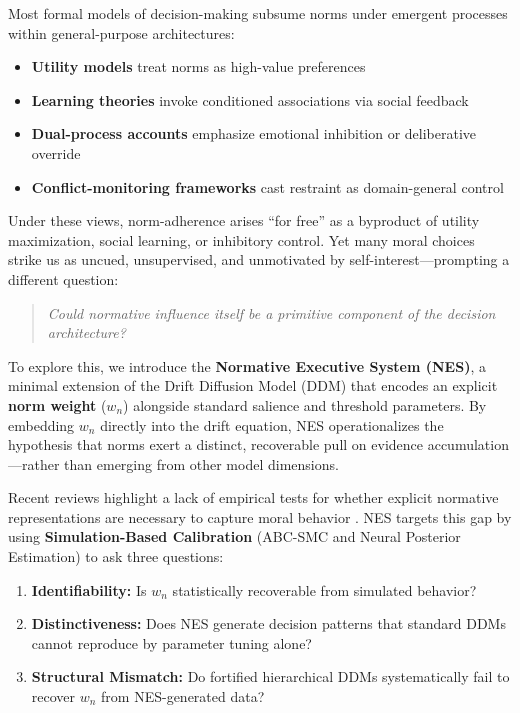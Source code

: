 \documentclass[
  11pt,
]{article}
\providecommand{\tightlist}{%
  \setlength{\itemsep}{0pt}\setlength{\parskip}{0pt}}
\begin{document}
Most formal models of decision-making subsume norms under emergent
processes within general-purpose architectures:

\begin{itemize}
\tightlist
\item
  \textbf{Utility models} treat norms as high-value preferences\\
\item
  \textbf{Learning theories} invoke conditioned associations via social
  feedback\\
\item
  \textbf{Dual-process accounts} emphasize emotional inhibition or
  deliberative override\\
\item
  \textbf{Conflict-monitoring frameworks} cast restraint as
  domain-general control
\end{itemize}

Under these views, norm-adherence arises ``for free'' as a byproduct of
utility maximization, social learning, or inhibitory control. Yet many
moral choices strike us as uncued, unsupervised, and unmotivated by
self-interest---prompting a different question:

\begin{quote}
\emph{Could normative influence itself be a primitive component of the
decision architecture?}
\end{quote}

To explore this, we introduce the \textbf{Normative Executive System
(NES)}, a minimal extension of the Drift Diffusion Model (DDM) that
encodes an explicit \textbf{norm weight} (\(w_n\)) alongside standard
salience and threshold parameters. By embedding \(w_n\) directly into
the drift equation, NES operationalizes the hypothesis that norms exert
a distinct, recoverable pull on evidence accumulation---rather than
emerging from other model dimensions.

Recent reviews highlight a lack of empirical tests for whether explicit
normative representations are necessary to capture moral behavior
\autocite{bello2023computationalapproachesto,cushman2015moralconstraints}.
NES targets this gap by using \textbf{Simulation-Based Calibration}
(ABC-SMC and Neural Posterior Estimation) to ask three questions:

\begin{enumerate}
\def\labelenumi{\arabic{enumi}.}
\tightlist
\item
  \textbf{Identifiability:} Is \(w_n\) statistically recoverable from
  simulated behavior?\\
\item
  \textbf{Distinctiveness:} Does NES generate decision patterns that
  standard DDMs cannot reproduce by parameter tuning alone?\\
\item
  \textbf{Structural Mismatch:} Do fortified hierarchical DDMs
  systematically fail to recover \(w_n\) from NES-generated data?
\end{enumerate}
\end{document}
